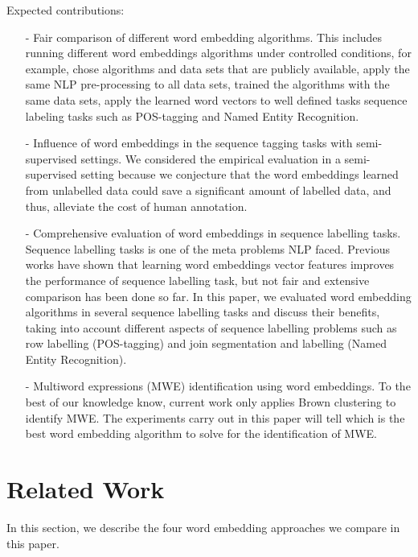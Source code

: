 \documentclass[11pt]{article}
\begin{document}
Expected contributions:
\begin{itemize}
\item[-] Fair comparison of different word embedding algorithms. This
  includes running different word embeddings algorithms under controlled
  conditions, for example, chose algorithms and data sets that are
  publicly available, apply the same NLP pre-processing to all data
  sets, trained the algorithms with the same data sets, apply the
  learned word vectors to well defined tasks sequence labeling tasks
  such as POS-tagging and Named Entity Recognition.

\item[-] Influence of word embeddings in the sequence tagging tasks with
  semi-supervised settings. We considered the empirical evaluation in a
  semi-supervised setting because we conjecture that the word embeddings
  learned from unlabelled data could save a significant amount of
  labelled data, and thus, alleviate the cost of human annotation.

\item[-] Comprehensive evaluation of word embeddings in sequence
  labelling tasks.  Sequence labelling tasks is one of the meta problems
  NLP faced. Previous works have shown that learning word embeddings
  vector features improves the performance of sequence labelling task,
  but not fair and extensive comparison has been done so far. In this
  paper, we evaluated word embedding algorithms in several sequence
  labelling tasks and discuss their benefits, taking into account
  different aspects of sequence labelling problems such as row labelling
  (POS-tagging) and join segmentation and labelling (Named Entity
  Recognition).

\item[-] Multiword expressions (MWE) identification using word
  embeddings.  To the best of our knowledge know, current work only
  applies Brown clustering to identify MWE. The experiments carry out in
  this paper will tell which is the best word embedding algorithm to
  solve for the identification of MWE.
\end{itemize}




\section{Related Work}
In this section, we describe the four word embedding approaches we compare in this paper.
\end{document}
